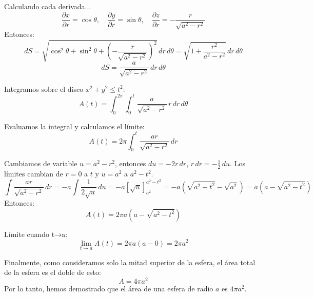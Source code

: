 Calculando cada derivada...
\[
   \frac{\partial x}{\partial r} = \cos \theta, \quad \frac{\partial y}{\partial r} = \sin \theta, \quad \frac{\partial z}{\partial r} = -\frac{r}{\sqrt{a^2 - r^2}}
   \]
Entonces:
\[
   dS = \sqrt{\cos^2 \theta + \sin^2 \theta + \left( -\frac{r}{\sqrt{a^2 - r^2}} \right)^2} \, dr \, d\theta = \sqrt{1 + \frac{r^2}{a^2 - r^2}} \, dr \, d\theta
   \]
\[
   dS = \frac{a}{\sqrt{a^2 - r^2}} \, dr \, d\theta
   \]


Integramos sobre el disco \( x^2 + y^2 \leq t^2 \):
\[
   A(t) = \int_{0}^{2\pi} \int_{0}^{t} \frac{a}{\sqrt{a^2 - r^2}} \, r \, dr \, d\theta
   \]


Evaluamos la integral y calculamos el límite:
\[
   A(t) = 2\pi \int_{0}^{t} \frac{ar}{\sqrt{a^2 - r^2}} \, dr
   \]

Cambiamos de variable \( u = a^2 - r^2 \), entonces \( du = -2r \, dr \), \( r \, dr = -\frac{1}{2} \, du \). Los límites cambian de \( r = 0 \) a \( t \) y \( u = a^2 \) a \( a^2 - t^2 \).
\[
   \int \frac{ar}{\sqrt{a^2 - r^2}} \, dr = -a \int \frac{1}{2\sqrt{u}} \, du = -a \left[\sqrt{u}\right]_{a^2}^{a^2 - t^2} = -a\left(\sqrt{a^2 - t^2} - \sqrt{a^2}\right) = a\left(a - \sqrt{a^2 - t^2}\right)
   \]
Entonces:
\[
   A(t) = 2\pi a(a - \sqrt{a^2 - t^2})
   \]


Límite cuando t→a:
\[
   \lim_{t \to a} A(t) = 2\pi a (a - 0) = 2\pi a^2
   \]


Finalmente, como consideramos solo la mitad superior de la esfera, el área total de la esfera es el doble de esto:
\[
A = 4\pi a^2
\]
Por lo tanto, hemos demostrado que el área de una esfera de radio $a$ es \( 4\pi a^2 \).